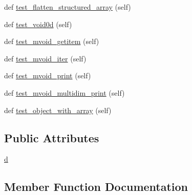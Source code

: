 \begin{DoxyCompactItemize}
\item 
def \hyperlink{classnumpy_1_1ma_1_1tests_1_1test__core_1_1TestMaskedArray_a07bb90f39d9ae27b4d8a6e9af889fe73}{test\+\_\+flatten\+\_\+structured\+\_\+array} (self)
\item 
def \hyperlink{classnumpy_1_1ma_1_1tests_1_1test__core_1_1TestMaskedArray_a4ce2eaaaee3269b6f7a87bd3ac454aea}{test\+\_\+void0d} (self)
\item 
def \hyperlink{classnumpy_1_1ma_1_1tests_1_1test__core_1_1TestMaskedArray_a9a956849e34584fbf79fa371df936049}{test\+\_\+mvoid\+\_\+getitem} (self)
\item 
def \hyperlink{classnumpy_1_1ma_1_1tests_1_1test__core_1_1TestMaskedArray_adf2a99db6a1a645437bbf3f6bf77309f}{test\+\_\+mvoid\+\_\+iter} (self)
\item 
def \hyperlink{classnumpy_1_1ma_1_1tests_1_1test__core_1_1TestMaskedArray_a176dd93799126716ea38fbceba13aafb}{test\+\_\+mvoid\+\_\+print} (self)
\item 
def \hyperlink{classnumpy_1_1ma_1_1tests_1_1test__core_1_1TestMaskedArray_a0fe4d4a96985d88a0df5cb25a7f6e676}{test\+\_\+mvoid\+\_\+multidim\+\_\+print} (self)
\item 
def \hyperlink{classnumpy_1_1ma_1_1tests_1_1test__core_1_1TestMaskedArray_adc41b6d784cb9f315cc27efd062d3367}{test\+\_\+object\+\_\+with\+\_\+array} (self)
\end{DoxyCompactItemize}
\subsection*{Public Attributes}
\begin{DoxyCompactItemize}
\item 
\hyperlink{classnumpy_1_1ma_1_1tests_1_1test__core_1_1TestMaskedArray_a262adc7f731598bbd77eea12f05d32e2}{d}
\end{DoxyCompactItemize}


\subsection{Member Function Documentation}
\mbox{\label{classnumpy_1_1ma_1_1tests_1_1test__core_1_1TestMaskedArray_ad7a25a2b2ec395a20ce646e04748e2ee}} 
